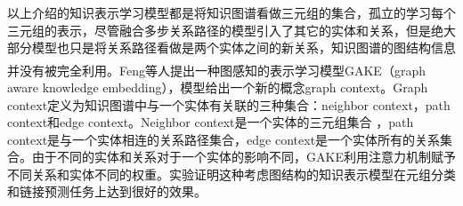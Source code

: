 \documentclass[twocolumn]{article}
\newcommand{\upcite}[1]{\textsuperscript{\textsuperscript{\cite{#1}}}}
\begin{document}
以上介绍的知识表示学习模型都是将知识图谱看做三元组的集合，孤立的学习每个三元组的表示，尽管融合多步关系路径的模型引入了其它的实体和关系，但是绝大部分模型也只是将关系路径看做是两个实体之间的新关系，知识图谱的图结构信息并没有被完全利用。Feng等人\upcite{GAKE}提出一种图感知的表示学习模型GAKE（graph aware knowledge embedding），模型给出一个新的概念graph context。Graph context定义为知识图谱中与一个实体有关联的三种集合：neighbor context，path context和edge context。Neighbor context是一个实体的三元组集合
，path context是与一个实体相连的关系路径集合，edge context是一个实体所有的关系集合。由于不同的实体和关系对于一个实体的影响不同，GAKE利用注意力机制赋予不同关系和实体不同的权重。实验证明这种考虑图结构的知识表示模型在元组分类和链接预测任务上达到很好的效果。

\end{document}

